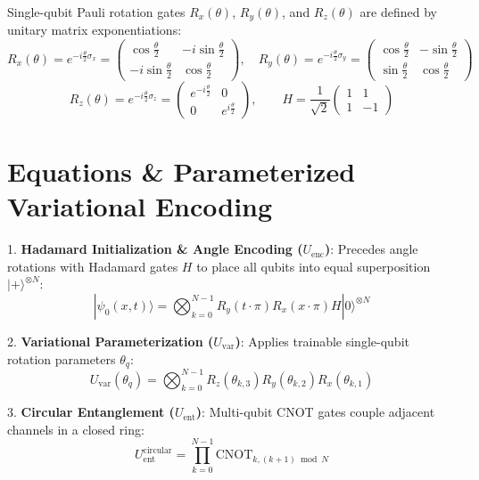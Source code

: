 \documentclass[pdflatex,sn-jnl]{sn-jnl}%
\begin{document}
Single-qubit Pauli rotation gates $R_x(\theta)$, $R_y(\theta)$, and $R_z(\theta)$ are defined by unitary matrix exponentiations:
\begin{equation}\label{eq:rotations}
R_x(\theta) = e^{-i \frac{\theta}{2} \sigma_x} = \begin{pmatrix} \cos\frac{\theta}{2} & -i\sin\frac{\theta}{2} \\ -i\sin\frac{\theta}{2} & \cos\frac{\theta}{2} \end{pmatrix}, \quad R_y(\theta) = e^{-i \frac{\theta}{2} \sigma_y} = \begin{pmatrix} \cos\frac{\theta}{2} & -\sin\frac{\theta}{2} \\ \sin\frac{\theta}{2} & \cos\frac{\theta}{2} \end{pmatrix}
\end{equation}
\begin{equation}\label{eq:rz_h}
R_z(\theta) = e^{-i \frac{\theta}{2} \sigma_z} = \begin{pmatrix} e^{-i\frac{\theta}{2}} & 0 \\ 0 & e^{i\frac{\theta}{2}} \end{pmatrix}, \qquad H = \frac{1}{\sqrt{2}} \begin{pmatrix} 1 & 1 \\ 1 & -1 \end{pmatrix}
\end{equation}

\section{Equations \& Parameterized Variational Encoding}\label{sec4}
1. \textbf{Hadamard Initialization \& Angle Encoding ($U_{\text{enc}}$)}: Precedes angle rotations with Hadamard gates $H$ to place all qubits into equal superposition $|+\rangle^{\otimes N}$:
\begin{equation}\label{eq:encoding}
|\psi_0(x,t)\rangle = \bigotimes_{k=0}^{N-1} R_y(t \cdot \pi) R_x(x \cdot \pi) H |0\rangle^{\otimes N}
\end{equation}

2. \textbf{Variational Parameterization ($U_{\text{var}}$)}: Applies trainable single-qubit rotation parameters $\theta_q$:
\begin{equation}\label{eq:variational}
U_{\text{var}}(\theta_q) = \bigotimes_{k=0}^{N-1} R_z(\theta_{k,3}) R_y(\theta_{k,2}) R_x(\theta_{k,1})
\end{equation}

3. \textbf{Circular Entanglement ($U_{\text{ent}}$)}: Multi-qubit CNOT gates couple adjacent channels in a closed ring:
\begin{equation}\label{eq:entanglement}
U_{\text{ent}}^{\text{circular}} = \prod_{k=0}^{N-1} \text{CNOT}_{k, (k+1) \bmod N}
\end{equation}
\end{document}
